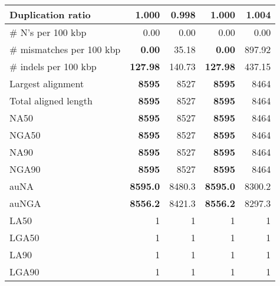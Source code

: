 \documentclass[12pt,a4paper]{article}
\begin{document}
\begin{table}[ht]
\begin{center}
\begin{tabular}{|l*{4}{|r}|}
Duplication ratio & 1.000 & {\bf 0.998} & 1.000 & 1.004 \\ \hline
\# N's per 100 kbp & 0.00 & 0.00 & 0.00 & 0.00 \\ \hline
\# mismatches per 100 kbp & {\bf 0.00} & 35.18 & {\bf 0.00} & 897.92 \\ \hline
\# indels per 100 kbp & {\bf 127.98} & 140.73 & {\bf 127.98} & 437.15 \\ \hline
Largest alignment & {\bf 8595} & 8527 & {\bf 8595} & 8464 \\ \hline
Total aligned length & {\bf 8595} & 8527 & {\bf 8595} & 8464 \\ \hline
NA50 & {\bf 8595} & 8527 & {\bf 8595} & 8464 \\ \hline
NGA50 & {\bf 8595} & 8527 & {\bf 8595} & 8464 \\ \hline
NA90 & {\bf 8595} & 8527 & {\bf 8595} & 8464 \\ \hline
NGA90 & {\bf 8595} & 8527 & {\bf 8595} & 8464 \\ \hline
auNA & {\bf 8595.0} & 8480.3 & {\bf 8595.0} & 8300.2 \\ \hline
auNGA & {\bf 8556.2} & 8421.3 & {\bf 8556.2} & 8297.3 \\ \hline
LA50 & 1 & 1 & 1 & 1 \\ \hline
LGA50 & 1 & 1 & 1 & 1 \\ \hline
LA90 & 1 & 1 & 1 & 1 \\ \hline
LGA90 & 1 & 1 & 1 & 1 \\ \hline
\end{tabular}
\end{center}
\end{table}
\end{document}
